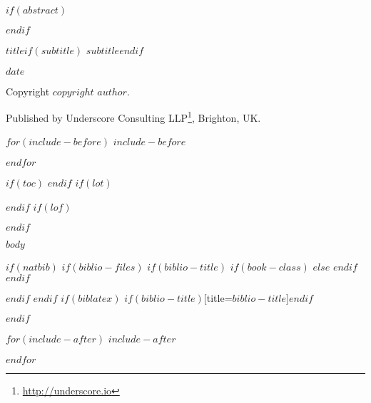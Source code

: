 \documentclass[$if(fontsize)$$fontsize$$else$12pt$endif$,$if(lang)$$lang$,$endif$$if(papersize)$$papersize$,$endif$$for(classoption)$$classoption$$sep$,$endfor$]{$documentclass$}
\renewcommand{\href}[2]{#2\footnote{\url{#1}}}
\begin{document}
\pagecolor{white}


$if(abstract)$
\begin{abstract}
$abstract$
\end{abstract}
$endif$


\vspace*{\fill}

\begin{center}

{\Large $title$$if(subtitle)$ $subtitle$$endif$}

$date$

Copyright $copyright$ $author$.

Published by \href{http://underscore.io}{Underscore Consulting LLP}, Brighton, UK.

\end{center}

\vspace{1em}

$for(include-before)$
$include-before$

$endfor$

\vspace*{\fill}


$if(toc)$
{
\hypersetup{linkcolor=black}
\setcounter{tocdepth}{$if(toc-depth)$$toc-depth$$else$3$endif$}
\tableofcontents
}
$endif$
$if(lot)$
\listoftables
$endif$
$if(lof)$
\listoffigures
$endif$


$body$


$if(natbib)$
$if(biblio-files)$
$if(biblio-title)$
$if(book-class)$
\renewcommand\bibname{$biblio-title$}
$else$
\renewcommand\refname{$biblio-title$}
$endif$
$endif$


$endif$
$endif$
$if(biblatex)$
\printbibliography$if(biblio-title)$[title=$biblio-title$]$endif$

$endif$


$for(include-after)$
$include-after$

$endfor$

\end{document}
